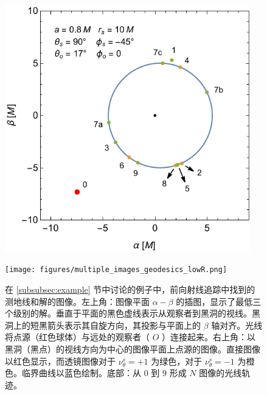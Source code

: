 \documentclass[aps,reprint,superscriptaddress,nofootinbib,floatfix,longbibliography,preprintnumbers]{revtex4-1}
\begin{document}
\begin{figure}[ht]
\begin{minipage}{0.45\textwidth}
        \includegraphics[width=0.95\textwidth]{figures/images.pdf}
    \end{minipage}
    \texttt{[image: figures/multiple\_images\_geodesics\_lowR.png]}
    \caption{在    \ref{subsubsec:example}    节中讨论的例子中，前向射线追踪中找到的测地线和解的图像。左上角：图像平面    $\alpha-\beta$    的插图，显示了最低三个级别的解。垂直于平面的黑色虚线表示从观察者到黑洞的视线。黑洞上的短黑箭头表示其自旋方向，其投影与平面上的    $\beta$    轴对齐。光线将点源（红色球体）与远处的观察者（   $O$   ）连接起来。右上角：以黑洞（黑点）的视线方向为中心的图像平面上点源的图像。直接图像以红色显示，而透镜图像对于    $\nu_{\theta}^s = +1$    为绿色，对于    $\nu_{\theta}^s = -1$    为橙色。临界曲线以蓝色绘制。底部：从    $0$    到    $9$    形成    $N$    图像的光线轨迹。  }
    \label{fig:images}
\end{figure}     
\end{document}
